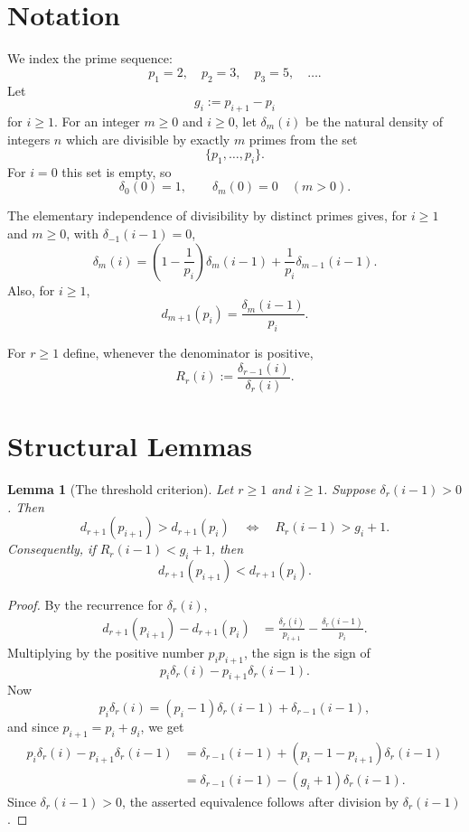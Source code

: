 \documentclass[11pt]{article}
\numberwithin{equation}{section}
\theoremstyle{plain}
\newtheorem{lemma}[theorem]{Lemma}
\theoremstyle{definition}
\theoremstyle{remark}
\begin{document}
\section{Notation}\label{sec:notation}

We index the prime sequence:
\[
        p_1=2,\quad p_2=3,\quad p_3=5,\quad \ldots .
\]
Let
\[
        g_i:=p_{i+1}-p_i
\]
for \(i\ge1\).
For an integer \(m\ge 0\) and \(i\ge0\), let \(\delta_m(i)\) be the natural density of integers \(n\) which are divisible by exactly \(m\) primes from the set
\[
        \{p_1,\ldots,p_i\}.
\]
For \(i=0\) this set is empty, so
\[
        \delta_0(0)=1,\qquad \delta_m(0)=0\quad(m>0).
\]

The elementary independence of divisibility by distinct primes gives, for \(i\ge1\) and \(m\ge0\), with \(\delta_{-1}(i-1)=0\),
\[
        \delta_m(i)=\left(1-\frac1{p_i}\right)\delta_m(i-1)
              +\frac1{p_i}\delta_{m-1}(i-1).
\]
Also, for \(i\ge1\),
\[
        d_{m+1}(p_i)=\frac{\delta_m(i-1)}{p_i}.
\]

For \(r\ge 1\) define, whenever the denominator is positive,
\[
        R_r(i):=\frac{\delta_{r-1}(i)}{\delta_r(i)}.
\]

\section{Structural Lemmas}
\label{sec:structural}

\begin{lemma}[The threshold criterion]\label{lem:threshold}
Let \(r\ge 1\) and \(i\ge1\).  Suppose \(\delta_r(i-1)>0\).  Then
\[
        d_{r+1}(p_{i+1})>d_{r+1}(p_i)
        \quad\Longleftrightarrow\quad
        R_r(i-1)>g_i+1.
\]
Consequently, if \(R_r(i-1)<g_i+1\), then
\[
        d_{r+1}(p_{i+1})<d_{r+1}(p_i).
\]
\end{lemma}

\begin{proof}
By the recurrence for \(\delta_r(i)\),
\[
\begin{aligned}
d_{r+1}(p_{i+1})-d_{r+1}(p_i)
&=\frac{\delta_r(i)}{p_{i+1}}-\frac{\delta_r(i-1)}{p_i}.
\end{aligned}
\]
Multiplying by the positive number \(p_i p_{i+1}\), the sign is the sign of
\[
        p_i\delta_r(i)-p_{i+1}\delta_r(i-1).
\]
Now
\[
        p_i\delta_r(i)
        =(p_i-1)\delta_r(i-1)+\delta_{r-1}(i-1),
\]
and since \(p_{i+1}=p_i+g_i\), we get
\[
\begin{aligned}
p_i\delta_r(i)-p_{i+1}\delta_r(i-1)
&=\delta_{r-1}(i-1)+(p_i-1-p_{i+1})\delta_r(i-1)\\
&=\delta_{r-1}(i-1)-(g_i+1)\delta_r(i-1).
\end{aligned}
\]
Since \(\delta_r(i-1)>0\), the asserted equivalence follows after division by
\(\delta_r(i-1)\).
\end{proof}
\end{document}
